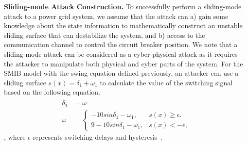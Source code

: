 \vspace{0.5em}
\noindent
{\bf Sliding-mode Attack Construction.} To successfully perform a sliding-mode attack to a power grid system, we assume that the attack can a) gain some knowledge about the state information to mathematically construct an unstable sliding surface that can destabilize the system, and b) access to the communication channel to control the circuit breaker position. We note that a sliding-mode attack can be considered as a cyber-physical attack as it requires the attacker to manipulate both physical and cyber parts of the system. For the SMIB model with the swing equation defined previously, an attacker can use a sliding surface $s(x) = \delta_1 + \omega_1$ to calculate the value of the switching signal based on the following equation.
%
\begin{align}
\dot{\delta_1} & = \omega \nonumber \\
\dot{\omega} & = 
\begin{cases}
    -10sin\delta_1 - \omega_1, & \text{$s(x) \geq \epsilon$}.\\
    9 - 10sin\delta_1 - \omega_1, & \text{$s(x) < -\epsilon$},
 \end{cases} \nonumber
\end{align},
where $\epsilon$ represents switching delays and hysteresis~\cite{liu2011class}.
%

